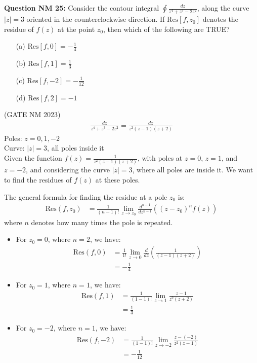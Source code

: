 \documentclass[journal,12pt,twocolumn]{IEEEtran}
\theoremstyle{remark}
\begin{document}
\title{}
\author{Sasa Mardi, EE23BTECH11222}
\date{}
\maketitle

\textbf{Question NM 25:} Consider the contour integral $\oint \frac{dz}{z^4 + z^3 - 2z^2}$, along the curve $|z| = 3$ oriented in the counterclockwise direction. If $\text{Res}[f, z_0]$ denotes the residue of $f(z)$ at the point $z_0$, then which of the following are TRUE? \\
\begin{enumerate}
    \item[(a)] $\text{Res}[f, 0] = -\frac{1}{4}$
    \item[(b)] $\text{Res}[f, 1] = \frac{1}{3}$
    \item[(c)] $\text{Res}[f, -2] = -\frac{1}{12}$
    \item[(d)] $\text{Res}[f, 2] = -1$
\end{enumerate}
\hfill{(GATE NM 2023)}\\
\solution
\begin{align}
\frac{dz}{z^4 + z^3 - 2z^2} = \frac{dz}{z^2(z-1)(z+2)}
\end{align}
Poles: $z = 0, 1, -2$ \\
Curve: $|z| = 3$, all poles inside it \\
Given the function $f(z) = \frac{1}{z^2(z-1)(z+2)}$, with poles at $z = 0$, $z = 1$, and $z = -2$, and considering the curve $|z| = 3$, where all poles are inside it. We want to find the residues of $f(z)$ at these poles.

The general formula for finding the residue at a pole $z_0$ is:
\begin{align}
\text{Res}(f, z_0) &= \frac{1}{(n-1)!} \lim_{z \to z_0} \frac{d^{n-1}}{dz^{n-1}} \left( (z - z_0)^n f(z) \right)
\end{align}
where $n$ denotes how many times the pole is repeated.

\begin{itemize}
    \item For $z_0 = 0$, where $n = 2$, we have:
    \begin{align}
    \text{Res}(f, 0) &= \frac{1}{1!} \lim_{z \to 0} \frac{d}{dz} \left( \frac{1}{(z-1)(z+2)} \right) \\
    &= -\frac{1}{4}
    \end{align}
    
    \item For $z_0 = 1$, where $n = 1$, we have:
    \begin{align}
    \text{Res}(f, 1) &= \frac{1}{(1-1)!} \lim_{z \to 1} \frac{z-1}{z^2(z+2)} \\
    &= \frac{1}{3}
    \end{align}
    
    \item For $z_0 = -2$, where $n = 1$, we have:
    \begin{align}
    \text{Res}(f, -2) &= \frac{1}{(1-1)!} \lim_{z \to -2} \frac{z-(-2)}{z^2(z-1)} \\
    &= -\frac{1}{12}
    \end{align}
\end{itemize}
\end{document}
